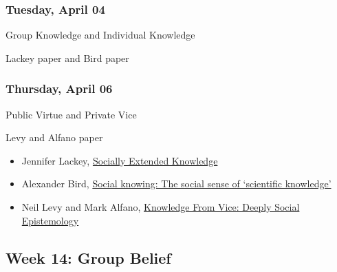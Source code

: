\documentclass[
]{article}
\providecommand{\tightlist}{%
  \setlength{\itemsep}{0pt}\setlength{\parskip}{0pt}}
\begin{document}
\begin{multicols}{2}

\hypertarget{tuesday-april-04}{%
\subsubsection{Tuesday, April 04}\label{tuesday-april-04}}

\begin{description}
\tightlist
\item[Topic]
Group Knowledge and Individual Knowledge
\item[Reading]
Lackey paper and Bird paper
\end{description}

\hypertarget{thursday-april-06}{%
\subsubsection{Thursday, April 06}\label{thursday-april-06}}

\begin{description}
\tightlist
\item[Topic]
Public Virtue and Private Vice
\item[Reading]
Levy and Alfano paper
\end{description}

\end{multicols}

\begin{itemize}
\tightlist
\item
  Jennifer Lackey, \href{https://philpapers.org/rec/LACSEK}{Socially
  Extended Knowledge}
\item
  Alexander Bird, \href{https://philpapers.org/rec/BIRSKT}{Social
  knowing: The social sense of `scientific knowledge'}
\item
  Neil Levy and Mark Alfano,
  \href{https://philpapers.org/rec/LEVKFV}{Knowledge From Vice: Deeply
  Social Epistemology}
\end{itemize}

\hypertarget{week-14-group-belief}{%
\subsection{Week 14: Group Belief}\label{week-14-group-belief}}
\end{document}
